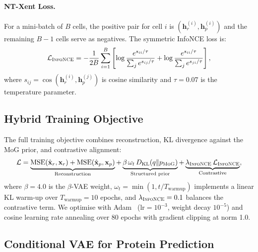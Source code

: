 \documentclass[11pt,a4paper]{article}
\newcommand{\mog}{\textsc{MoG}}
\newcommand{\nce}{\textsc{InfoNCE}}
\newcommand{\bx}{\mathbf{x}}
\begin{document}
\paragraph{NT-Xent Loss.}
For a mini-batch of $B$ cells, the positive pair for cell $i$ is $(\mathbf{h}_r^{(i)}, \mathbf{h}_p^{(i)})$ and the remaining $B{-}1$ cells serve as negatives.
The symmetric InfoNCE loss is:
\begin{equation}\label{eq:infonce}
  \mathcal{L}_\nce = -\frac{1}{2B}\sum_{i=1}^{B}\left[
    \log\frac{e^{s_{ii}/\tau}}{\sum_j e^{s_{ij}/\tau}} +
    \log\frac{e^{s_{ii}/\tau}}{\sum_j e^{s_{ji}/\tau}}
  \right],
\end{equation}
where $s_{ij} = \cos(\mathbf{h}_r^{(i)}, \mathbf{h}_p^{(j)})$ is cosine similarity and $\tau=0.07$ is the temperature parameter.

\subsection{Hybrid Training Objective}\label{ssec:objective}

The full training objective combines reconstruction, KL divergence against the MoG prior, and contrastive alignment:
\begin{equation}\label{eq:total_loss}
  \mathcal{L} = \underbrace{\text{MSE}(\hat{\bx}_r, \bx_r) + \text{MSE}(\hat{\bx}_p, \bx_p)}_{\text{Reconstruction}}
  + \underbrace{\beta\,\omega_t\,D_\text{KL}(q \| p_{\mog})}_{\text{Structured prior}}
  + \underbrace{\lambda_\nce\,\mathcal{L}_\nce}_{\text{Contrastive}},
\end{equation}
where $\beta=4.0$ is the $\beta$-VAE weight, $\omega_t = \min(1, t/T_\text{warmup})$ implements a linear KL warm-up over $T_\text{warmup}=10$ epochs, and $\lambda_\nce=0.1$ balances the contrastive term.
We optimise with Adam~\citep{kingma2015adam} ($\text{lr}=10^{-3}$, weight decay $10^{-5}$) and cosine learning rate annealing over 80 epochs with gradient clipping at norm 1.0.

\subsection{Conditional VAE for Protein Prediction}\label{ssec:cvae}
\end{document}

